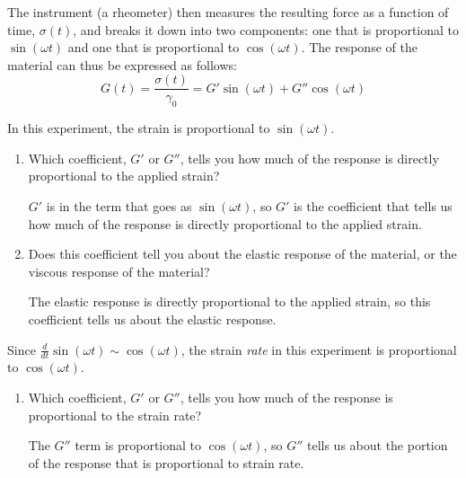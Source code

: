 \begin{activity}
\begin{model}
	The instrument (a rheometer) then measures the resulting force as a function of time, $\sigma(t)$, and breaks it down into two components: one that is proportional to $\sin(\omega t)$ and one that is proportional to $\cos(\omega t)$. The response of the material can thus be expressed as follows:
	\begin{equation*}
		G(t) = \frac{\sigma(t)}{\gamma_0} = G' \sin(\omega t) + G'' \cos(\omega t)
	\end{equation*}

\end{model}

\begin{ctqs}
		
		\question In this experiment, the strain is proportional to $\sin(\omega t)$.  
			\begin{enumerate}
				\item Which coefficient, $G'$ or $G''$, tells you how much of the response is directly proportional to the applied strain?
	
					\begin{solution}[1in]
						$G'$ is in the term that goes as $\sin(\omega t)$, so $G'$ is the coefficient that tells us how much of the response is directly proportional to the applied strain.
					\end{solution}
		
		\item Does this coefficient tell you about the elastic response of the material, or the viscous response of the material?
	
					\begin{solution}[1in]
						The elastic response is directly proportional to the applied strain, so this coefficient tells us about the elastic response.
					\end{solution}
					
			\end{enumerate}
			
		\question Since $\frac{d}{dt}\sin(\omega t) \sim \cos(\omega t)$, the strain \emph{rate} in this experiment is proportional to $\cos(\omega t)$.
		
			\begin{enumerate}
		
				\item Which coefficient, $G'$ or $G''$, tells you how much of the response is proportional to the strain rate?
	
					\begin{solution}[1in]
						The $G''$ term is proportional to $\cos(\omega t)$, so $G''$ tells us about the portion of the response that is proportional to strain rate.
					\end{solution}
		

\end{enumerate}
\end{ctqs}
\end{activity}
